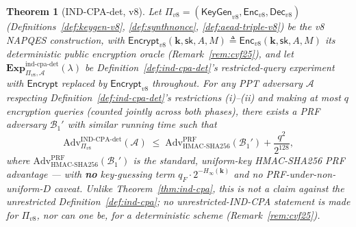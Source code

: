 \documentclass[11pt,a4paper]{article}
\newtheorem{theorem}{Theorem}[section]
\begin{document}
\begin{theorem}[IND-CPA-det, v8]\label{thm:ind-cpa-v8}
Let $\Pi_{v8}=(\mathsf{KeyGen}_{v8},\mathsf{Enc}_{v8},\mathsf{Dec}_{v8})$
(Definitions~\ref{def:keygen-v8}, \ref{def:synthnonce},
\ref{def:aead-triple-v8}) be the v8 NAPQES construction, with
$\mathsf{Encrypt}_{v8}(\mathbf{k},\mathsf{sk},A,M)\triangleq
\mathsf{Enc}_{v8}(\mathbf{k},\mathsf{sk},A,M)$ its \emph{deterministic}
public encryption oracle (Remark~\ref{rem:cvf25}), and let
$\mathbf{Exp}^{\mathrm{ind\text{-}cpa\text{-}det}}_{\Pi_{v8},\mathcal{A}}(\lambda)$
be Definition~\ref{def:ind-cpa-det}'s restricted-query experiment with
$\mathsf{Encrypt}$ replaced by $\mathsf{Encrypt}_{v8}$ throughout. For any
PPT adversary $\mathcal{A}$ respecting Definition~\ref{def:ind-cpa-det}'s
restrictions (i)--(ii) and making at most $q$ encryption queries (counted
jointly across both phases), there exists a PRF adversary $\mathcal{B}_1'$
with similar running time such that
\[
  \mathrm{Adv}^{\mathrm{IND\text{-}CPA\text{-}det}}_{\Pi_{v8}}(\mathcal{A})
  \;\leq\;
  \mathrm{Adv}^{\mathrm{PRF}}_{\mathrm{HMAC\text{-}SHA256}}(\mathcal{B}_1')
  + \frac{q^2}{2^{128}},
\]
where $\mathrm{Adv}^{\mathrm{PRF}}_{\mathrm{HMAC\text{-}SHA256}}(\mathcal{B}_1')$
is the \emph{standard, uniform-key} HMAC-SHA256 PRF advantage --- with
\textbf{no} key-guessing term $q_F\cdot2^{-H_\infty(\mathbf{k})}$ and no
PRF-under-non-uniform-$D$ caveat. Unlike Theorem~\ref{thm:ind-cpa}, this is
\emph{not} a claim against the unrestricted Definition~\ref{def:ind-cpa};
no unrestricted-IND-CPA statement is made for $\Pi_{v8}$, nor can one be,
for a deterministic scheme (Remark~\ref{rem:cvf25}).
\end{theorem}
\end{document}
